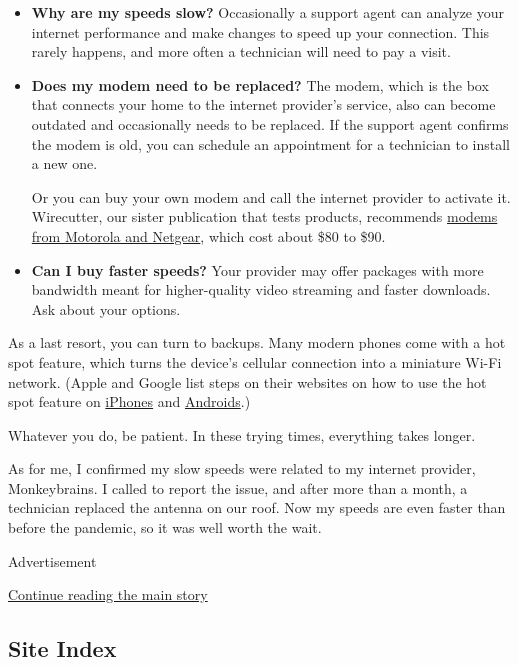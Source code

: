 \begin{itemize}
\item
  \textbf{Why are my speeds slow?} Occasionally a support agent can
  analyze your internet performance and make changes to speed up your
  connection. This rarely happens, and more often a technician will need
  to pay a visit.
\item
  \textbf{Does my modem need to be replaced?} The modem, which is the
  box that connects your home to the internet provider's service, also
  can become outdated and occasionally needs to be replaced. If the
  support agent confirms the modem is old, you can schedule an
  appointment for a technician to install a new one.

  Or you can buy your own modem and call the internet provider to
  activate it. Wirecutter, our sister publication that tests products,
  recommends
  \href{https://thewirecutter.com/reviews/best-cable-modem/}{modems from
  Motorola and Netgear}, which cost about \$80 to \$90.
\item
  \textbf{Can I buy faster speeds?} Your provider may offer packages
  with more bandwidth meant for higher-quality video streaming and
  faster downloads. Ask about your options.
\end{itemize}

As a last resort, you can turn to backups. Many modern phones come with
a hot spot feature, which turns the device's cellular connection into a
miniature Wi-Fi network. (Apple and Google list steps on their websites
on how to use the hot spot feature on
\href{https://support.apple.com/en-us/HT204023}{iPhones} and
\href{https://support.google.com/android/answer/9059108?hl=en}{Androids}.)

Whatever you do, be patient. In these trying times, everything takes
longer.

As for me, I confirmed my slow speeds were related to my internet
provider, Monkeybrains. I called to report the issue, and after more
than a month, a technician replaced the antenna on our roof. Now my
speeds are even faster than before the pandemic, so it was well worth
the wait.

Advertisement

\protect\hyperlink{after-bottom}{Continue reading the main story}

\hypertarget{site-index}{%
\subsection{Site Index}\label{site-index}}

